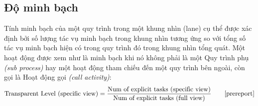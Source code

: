 \subsection{Độ minh bạch}
Tính minh bạch của một quy trình trong một khung nhìn (lane) cụ thể được xác định bởi số lượng tác vụ minh bạch trong khung nhìn tương ứng so với tổng số tác vụ minh bạch hiện có trong quy trình đó trong khung nhìn tổng quát. Một hoạt động được xem như là minh bạch khi nó không phải là một Quy trình phụ \emph{(sub process)} hay một hoạt động tham chiếu đến một quy trình bên ngoài, còn gọi là Hoạt động gọi \emph{(call activity)}:
\[ \text{Transparent Level (specific view)}  = \frac{\text{Num of explicit tasks (specific view)} }{\text{Num of explicit tasks (full view)}} \tag*{\cite{prereport}}\]
